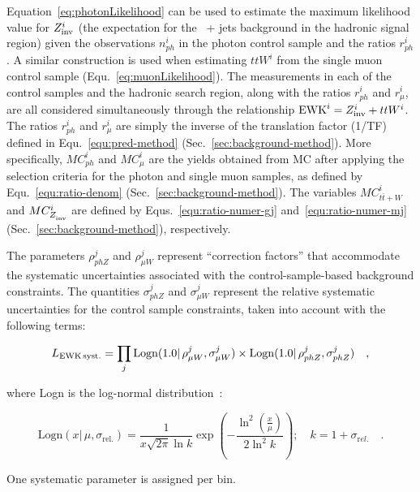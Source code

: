 Equation~\ref{eq:photonLikelihood} can be used to estimate the maximum
likelihood value for $Z_{\rm inv}^{i}$ (the expectation for the \znunu\ +
jets background in the hadronic signal region) given the observations
$n_{ph}^i$ in the photon control sample and the ratios $r_{ph}^i$. A
similar construction is used when estimating $ttW^{i}$ from the single 
muon control sample (Equ.~\ref{eq:muonLikelihood}). The measurements in 
each of the control samples and the hadronic search region, along with 
the ratios $r_{ph}^{i}$ and $r_{\mu}^{i}$, are all considered
simultaneously through the relationship $\mathrm{EWK}^i =  Z_{\rm inv}^{i} + ttW^{i}$.
The ratios $r_{ph}^{i}$ and $r_{\mu}^{i}$ are simply 
the inverse of the translation factor (1/TF) defined in 
Equ.~\ref{equ:pred-method} (Sec.~\ref{sec:background-method}). More 
specifically, $MC_{ph}^i$ and $MC_{\mu}^i$ are the yields obtained from MC
after applying the selection criteria for the photon and single muon samples, 
as defined by Equ.~\ref{equ:ratio-denom} (Sec.~\ref{sec:background-method}). 
The variables $MC_{t\bar{t}+W}^i$ and $MC_{Z_{\rm inv}^{}}^i$ are defined by 
Equs.~\ref{equ:ratio-numer-gj} and~\ref{equ:ratio-numer-mj} 
(Sec.~\ref{sec:background-method}), respectively.

The parameters $\rho_{phZ}^j$ and $\rho_{\mu
  W}^j$ represent ``correction factors'' that accommodate the
systematic uncertainties associated with the control-sample-based
background constraints.  The quantities $\sigma_{phZ}^j$
and $\sigma_{\mu W}^j$ represent the relative
systematic uncertainties for the control sample constraints, taken
into account with the following terms:

\begin{equation}
\label{eq:ewkSyst}
L_{\rm EWK\, syst.}=\prod_j \mathrm{Logn}( 1.0 |\,\rho_{\mu W}^j,
\sigma_{\mu W}^j)\times \mathrm{Logn}( 1.0 |\,\rho_{ph Z}^j,
\sigma_{phZ}^j) \quad ,
\end{equation}

where Logn is the log-normal
distribution~\cite{cousins-log-normal}:

\begin{equation}
\label{eq:log-normal}
\mathrm{Logn}(x |\,\mu,\sigma_{\mathrm{rel.}}) =
\frac{1}{x\sqrt{2\pi}\ln{k}}\exp{\left(-\frac{\ln^2{\left(\frac{x}{\mu}\right)}}{2\ln^2{k}}\right)};\quad
k=1+\sigma_{\mathrm rel.}\quad. 
\end{equation}

One systematic parameter is assigned per \HT bin.

